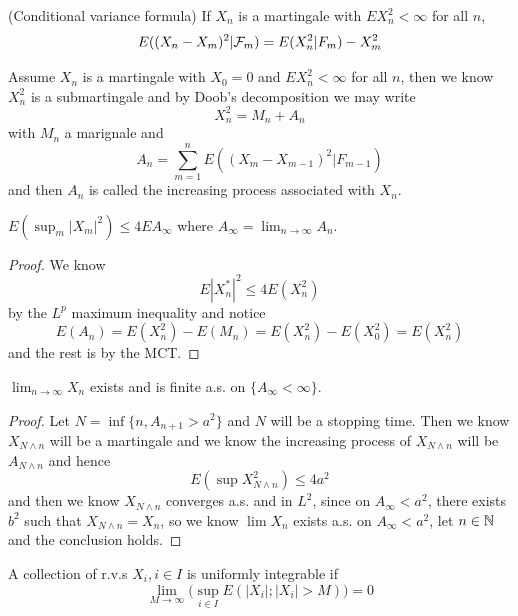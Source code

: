 \begin{theorem}
    (Conditional variance formula) If $X_n$ is a martingale with $EX_n^2 < \infty$ for all $n$,
    \[E((X_n-X_m)^2|\mathcal{F}_m) = E(X_n^2|F_m) - X_m^2\]
\end{theorem}

\begin{definition}
    Assume $X_n$ is a martingale with $X_0 = 0$ and $EX_n^2 < \infty$ for all $n$, then we know $X_n^2$ is a submartingale and by Doob's decomposition we may write
    \[X_n^2 = M_n+A_n\]
    with $M_n$ a marignale and
    \[A_n = \sum\limits_{m=1}^n E((X_m-X_{m-1})^2|F_{m-1})\]
    and then $A_n$ is called the increasing process associated with $X_n$. 
\end{definition}

\begin{theorem}
    $E(\sup_m|X_m|^2) \leq 4EA_{\infty}$ where $A_{\infty} = \lim_{n\to\infty}{A_n}$.
\end{theorem}
\begin{proof}
    We know
    \[
    E|X_n^*|^2 \leq 4 E(X_n^2)
    \]
    by the $L^p$ maximum inequality and notice
    \[
    E(A_n) = E(X_n^2)- E(M_n) = E(X_n^2) - E(X_0^2) = E(X_n^2)
    \]
    and the rest is by the MCT.
\end{proof}

\begin{theorem}
    $\lim_{n\to\infty} X_n$ exists and is finite a.s. on $\{A_{\infty} < \infty\}$.
\end{theorem}
\begin{proof}
    Let $N = \inf\{n, A_{n+1}>a^2\}$ and $N$ will be a stopping time. Then we know $X_{N\wedge n}$ will be a martingale and we know the increasing process of $X_{N\wedge n}$ will be $A_{N\wedge n}$ and hence
    \[E(\sup X_{N\wedge n}^2) \leq 4 a^2\]
    and then we know $X_{N\wedge n}$ converges a.s. and in $L^2$, since on $A_{\infty} < a^2$, there exists $b^2$ such that $X_{N\wedge n} = X_n$, so we know $\lim X_n$ exists a.s. on $A_{\infty} < a^2$, let $n \in \mathbb{N}$ and the conclusion holds.
\end{proof}

\begin{definition}
    A collection of r.v.s $X_i, i\in I$ is uniformly integrable if
    \[
    \lim_{M\to\infty}\Big(\sup_{i\in I} E(|X_i|;|X_i|>M)\Big) = 0
    \]
\end{definition}

